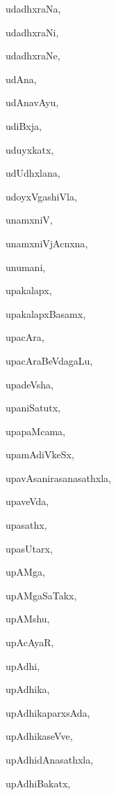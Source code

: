 \begin{multicols}{2}
{udadhxraNa}, \pageref{udadhxraNa}

{udadhxraNi}, \pageref{udadhxraNi}

{udadhxraNe}, \pageref{udadhxraNe}

{udAna}, \pageref{udAna}

{udAnavAyu}, \pageref{udAnavAyu}

{udiBxja}, \pageref{udiBxja}

{uduyxkatx}, \pageref{uduyxkatx}

{udUdhxlana}, \pageref{udUdhxlana}

{udoyxVgashiVla}, \pageref{udoyxVgashiVla}

{unamxniV}, \pageref{unamxniV}

{unamxniVjAcnxna}, \pageref{unamxniVjAcnxna}

{unumani}, \pageref{unumani}

{upakalapx}, \pageref{upakalapx}

{upakalapxBasamx}, \pageref{upakalapxBasamx}

{upacAra}, \pageref{upacAra}

{upacAraBeVdagaLu}, \pageref{upacAraBeVdagaLu}

{upadeVsha}, \pageref{upadeVsha}

{upaniSatutx}, \pageref{upaniSatutx}

{upapaMcama}, \pageref{upapaMcama}

{upamAdiVkeSx}, \pageref{upamAdiVkeSx}

{upavAsanirasanasathxla}, \pageref{upavAsanirasanasathxla}

{upaveVda}, \pageref{upaveVda}

{upasathx}, \pageref{upasathx}

{upasUtarx}, \pageref{upasUtarx}

{upAMga}, \pageref{upAMga}

{upAMgaSaTakx}, \pageref{upAMgaSaTakx}

{upAMshu}, \pageref{upAMshu}

{upAcAyaR}, \pageref{upAcAyaR}

{upAdhi}, \pageref{upAdhi}

{upAdhika}, \pageref{upAdhika}

{upAdhikaparxsAda}, \pageref{upAdhikaparxsAda}

{upAdhikaseVve}, \pageref{upAdhikaseVve}

{upAdhidAnasathxla}, \pageref{upAdhidAnasathxla}

{upAdhiBakatx}, \pageref{upAdhiBakatx}


\end{multicols}
